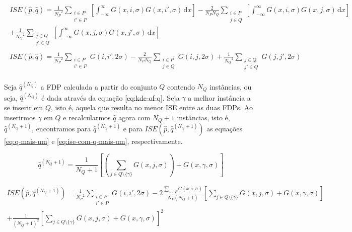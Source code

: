 \begin{gather*}
\begin{split}
ISE(\hat{p}, \hat{q}) = \frac{1}{{N_{P}}^2} \sum_{\substack{i \in P \\ i' \in P}} \left[\int_{-\infty}^{\infty} G(x, i, \sigma) G(x, i', \sigma) \, \mathrm{d}x\right] - \frac{2}{N_{P}N_{Q}} \sum_{\substack{i \in P \\ j \in Q}} \left[\int_{-\infty}^{\infty} G(x, i, \sigma) G(x, j, \sigma) \, \mathrm{d}x\right] \\
+ \frac{1}{{N_{Q}}^2} \sum_{\substack{j \in Q \\ j' \in Q}} \left[\int_{-\infty}^{\infty} G(x, j, \sigma) G(x, j', \sigma) \, \mathrm{d}x\right]
\end{split} \\
\begin{split}
ISE(\hat{p}, \hat{q}) = \frac{1}{{N_{P}}^2} \sum_{\substack{i \in P \\ i' \in P}} G(i, i', 2\sigma) - \frac{2}{N_{P}N_{Q}} \sum_{\substack{i \in P \\ j \in Q}} G(i, j, 2\sigma) + \frac{1}{{N_{Q}}^2} \sum_{\substack{j \in Q \\ j' \in Q}} G(j, j', 2\sigma)
\end{split}
\end{gather*}

Seja $\hat{q}^{(N_{Q})}$ a FDP calculada a partir do conjunto $Q$ contendo $N_{Q}$ instâncias, ou seja, $\hat{q}^{(N_{Q})}$ é dada através da equação \ref{eq:kde-of-q}. Seja $\gamma$ a melhor instância a se inserir em $Q$, isto é, aquela que resulta no menor ISE entre as duas FDPs. Ao inserirmos $\gamma$ em $Q$ e recalcularmos $\hat{q}$ agora com $N_{Q}+1$ instâncias, isto é, $\hat{q}^{(N_{Q}+1)}$, encontramos para $\hat{q}^{(N_{Q}+1)}$ e para $ISE(\hat{p}, \hat{q}^{(N_{Q}+1)})$ as equações \ref{eq:q-mais-um} e \ref{eq:ise-com-q-mais-um}, respectivamente.

\begin{equation}
\hat{q}^{(N_{Q}+1)} = \frac{1}{N_{Q}+1} \left[\left(\sum_{j \in Q \setminus \{ \gamma \}} G(x, j, \sigma)\right) + G(x, \gamma, \sigma)\right]
\label{eq:q-mais-um}
\end{equation}

\begin{equation}
\begin{split}
ISE(\hat{p}, \hat{q}^{(N_{Q}+1)}) = \frac{1}{{N_{P}}^2} \sum_{\substack{i \in P \\ i' \in P}} G(i, i', 2\sigma) - 2\frac{\sum_{i \in P} G(x, i, \sigma)}{N_{P}(N_{Q}+1)} \left[\sum_{j \in Q \setminus \{ \gamma \}} G(x, j, \sigma) + G(x, \gamma, \sigma)\right] \\ + \frac{1}{(N_{Q}+1)^2} \left[\sum_{j \in Q \setminus \{ \gamma \}} G(x, j, \sigma) + G(x, \gamma, \sigma)\right]^2
\end{split}
\label{eq:ise-com-q-mais-um}
\end{equation}

